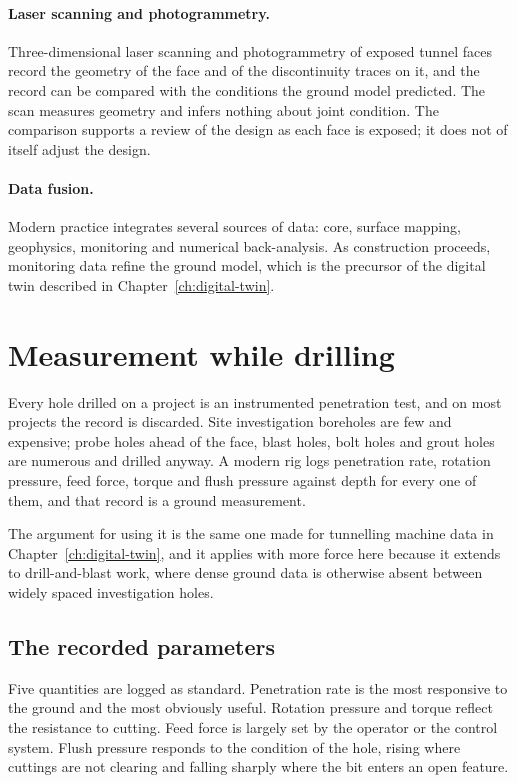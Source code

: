 \paragraph{Laser scanning and photogrammetry.}
Three-dimensional laser scanning and photogrammetry of exposed tunnel faces
record the geometry of the face and of the discontinuity traces on it, and
the record can be compared with the conditions the ground model predicted.
The scan measures geometry and infers nothing about joint condition. The
comparison supports a review of the design as each face is exposed; it does
not of itself adjust the design.

\paragraph{Data fusion.}
Modern practice integrates several sources of data: core, surface mapping,
geophysics, monitoring and numerical back-analysis. As construction proceeds,
monitoring data refine the ground model, which is the precursor of the
digital twin described in Chapter~\ref{ch:digital-twin}.

\section{Measurement while drilling}
\label{sec:mwd}

Every hole drilled on a project is an instrumented penetration test, and on
most projects the record is discarded. Site investigation boreholes are few
and expensive; probe holes ahead of the face, blast holes, bolt holes and
grout holes are numerous and drilled anyway. A modern rig logs penetration
rate, rotation pressure, feed force, torque and flush pressure against depth
for every one of them, and that record is a ground measurement.

The argument for using it is the same one made for tunnelling machine data in
Chapter~\ref{ch:digital-twin}, and it applies with more force here because it
extends to drill-and-blast work, where dense ground data is otherwise absent
between widely spaced investigation holes.

\subsection{The recorded parameters}
\label{sec:mwd-parameters}

Five quantities are logged as standard. Penetration rate is the most
responsive to the ground and the most obviously useful. Rotation pressure and
torque reflect the resistance to cutting. Feed force is largely set by the
operator or the control system. Flush pressure responds to the condition of
the hole, rising where cuttings are not clearing and falling sharply where the
bit enters an open feature.

